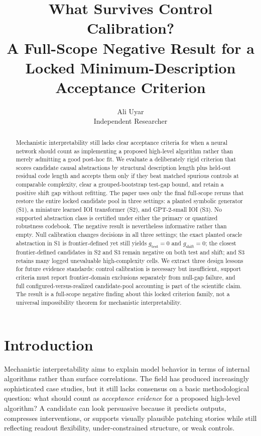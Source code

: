 \documentclass[10pt]{article}
\title{What Survives Control Calibration?\\
A Full-Scope Negative Result for a Locked Minimum-Description Acceptance Criterion}
\author{Ali Uyar\\Independent Researcher}
\newcommand{\gtest}{g_{\mathrm{test}}}
\newcommand{\gshift}{g_{\mathrm{shift}}}
\begin{document}
\maketitle

\begin{abstract}
Mechanistic interpretability still lacks clear acceptance criteria for when a neural network should count as implementing a proposed high-level algorithm rather than merely admitting a good post-hoc fit. We evaluate a deliberately rigid criterion that scores candidate causal abstractions by structural description length plus held-out residual code length and accepts them only if they beat matched spurious controls at comparable complexity, clear a grouped-bootstrap test-gap bound, and retain a positive shift gap without refitting. The paper uses only the final full-scope reruns that restore the entire locked candidate pool in three settings: a planted symbolic generator (S1), a miniature learned IOI transformer (S2), and GPT-2-small IOI (S3). No supported abstraction class is certified under either the primary or quantized robustness codebook. The negative result is nevertheless informative rather than empty. Null calibration changes decisions in all three settings; the exact planted oracle abstraction in S1 is frontier-defined yet still yields $\gtest=0$ and $\gshift=0$; the closest frontier-defined candidates in S2 and S3 remain negative on both test and shift; and S3 retains many logged unevaluable high-complexity cells. We extract three design lessons for future evidence standards: control calibration is necessary but insufficient, support criteria must report frontier-domain exclusions separately from null-gap failure, and full configured-versus-realized candidate-pool accounting is part of the scientific claim. The result is a full-scope negative finding about this locked criterion family, not a universal impossibility theorem for mechanistic interpretability.
\end{abstract}

\section{Introduction}

Mechanistic interpretability aims to explain model behavior in terms of internal algorithms rather than surface correlations. The field has produced increasingly sophisticated case studies, but it still lacks consensus on a basic methodological question: what should count as \emph{acceptance evidence} for a proposed high-level algorithm? A candidate can look persuasive because it predicts outputs, compresses interventions, or supports visually plausible patching stories while still reflecting readout flexibility, under-constrained structure, or weak controls.
\end{document}

